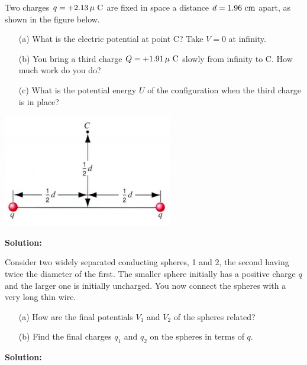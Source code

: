 \documentclass[11pt]{article}
\begin{document}
\begin{problem}[(E28.27)]
Two charges $q = +2.13\,\mu~\mathrm{C}$ are fixed in space a distance $d = 1.96~\mathrm{cm}$ apart, as shown in the figure below.
\begin{enumerate}
\item[(a) ] What is the electric potential at point C? Take $V=0$ at infinity.
\item[(b) ] You bring a third charge $Q = +1.91\,\mu~\mathrm{C}$ slowly from infinity to C. How much work do you do?
\item[(c) ] What is the potential energy $U$ of the configuration when the third charge is in place?
\end{enumerate}
\begin{center}
\includegraphics[scale=0.5]{prob3.png}
\end{center}
\end{problem}


\textbf{Solution:}


\clearpage

\begin{problem}[(E28.42)]
Consider two widely separated conducting spheres, 1 and 2, the second having twice the diameter of the first. The smaller sphere initially
has a positive charge $q$ and the larger one is initially uncharged. You now connect the spheres with a very long thin wire.
\begin{enumerate}
\item[(a) ] How are the final potentials $V_1$ and $V_2$ of the spheres related?
\item[(b) ] Find the final charges $q_1$ and $q_2$ on the spheres in terms of $q$.
\end{enumerate}
\end{problem}


\textbf{Solution:}
\end{document}
